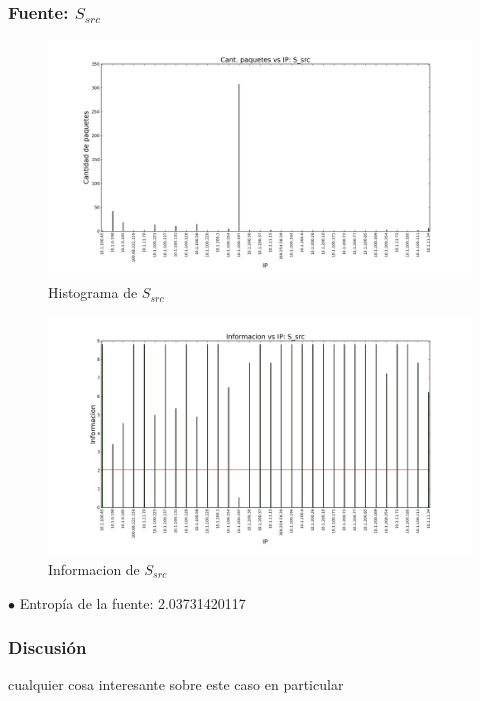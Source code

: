 \subsubsection{Fuente: $S_{src}$}

\begin{figure}[H]\centering
    \includegraphics[width=\linewidth]{../imgs/red-entrepiso-dc_S_src_hist.png}
    \caption{Histograma de $S_{src}$}\label{fig:entrepiso-dc-src-hist}
\end{figure}

\begin{figure}[H]\centering
    \includegraphics[width=\linewidth]{../imgs/red-entrepiso-dc_S_src_info.png}
    \caption{Informacion de $S_{src}$}\label{fig:entrepiso-dc-src-info}
\end{figure}

$\bullet$ Entropía de la fuente: 2.03731420117

\subsubsection{Discusión}

cualquier cosa interesante sobre este caso en particular